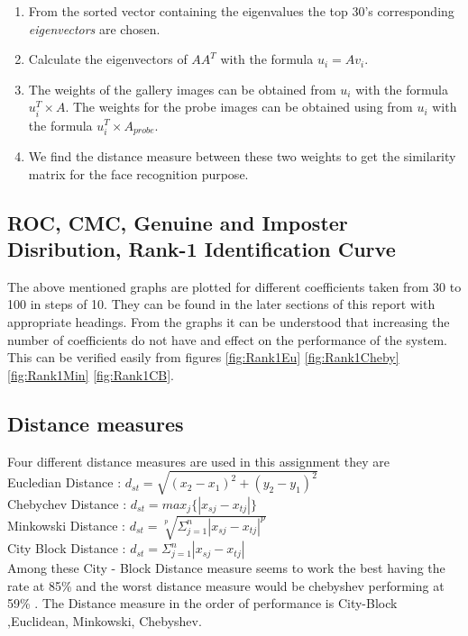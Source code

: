 \documentclass[10pt, letterpaper]{article}
\begin{document}
\begin{enumerate}
\item From the sorted vector containing the eigenvalues the top 30's corresponding {\sl eigenvectors} are chosen. 
\item Calculate the eigenvectors of $AA^{T}$ with the formula $u_{i} = Av_{i}$. 
\item The weights of the gallery images can be obtained from  $u_{i}$ with the formula $u_{i}^{T} \times A $. The weights for the probe images can be obtained using from $u_{i}$ with the formula $u_{i}^{T} \times A_{probe} $.
\item We find the distance measure between these two weights to get the similarity matrix for the face recognition purpose.

\end{enumerate}

\subsection{ ROC, CMC, Genuine and Imposter Disribution, Rank-1 Identification Curve}

The above mentioned graphs are plotted for different coefficients taken from 30 to 100 in steps of 10. They can be found in the later sections of this report with appropriate headings. From the graphs it can be understood that increasing the number of coefficients do not have and effect on the performance of the system. This can be verified easily from figures \ref{fig:Rank1Eu} \ref{fig:Rank1Cheby} \ref{fig:Rank1Min} \ref{fig:Rank1CB}.

\subsection{Distance measures}
Four different distance measures are used in this assignment they are \\
Eucledian Distance :   $ d_{st} =  \sqrt{  (x_{2} - x_{1})^2 + (y_{2} - y_{1})^2  }  $ \\
Chebychev Distance :  $ d_{st} = max_{j} \{ |x_{sj}  - x_{tj} | \}  $ \\
Minkowski Distance :  $    d_{st} = \sqrt[p]{ \Sigma_{j=1}^{n} |x_{sj} - x_{tj}|^{p} }    $\\
City Block Distance : $   d_{st} = \Sigma_{j=1}^{n} |x_{sj} - x_{tj}|     $  \\


Among these City - Block Distance measure seems to work the best having the rate at 85\% and the worst distance measure would be chebyshev performing at 59\% . The Distance measure in the order of performance is City-Block ,Euclidean, Minkowski, Chebyshev.
\end{document}
